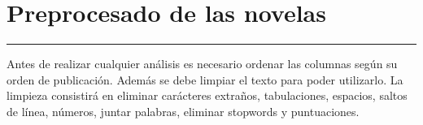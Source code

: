\documentclass[
]{article}
\begin{document}
\hypertarget{preprocesado-de-las-novelas}{%
\section{\texorpdfstring{\textbf{Preprocesado de las
novelas}}{Preprocesado de las novelas}}\label{preprocesado-de-las-novelas}}

\begin{center}\rule{0.5\linewidth}{0.5pt}\end{center}

Antes de realizar cualquier análisis es necesario ordenar las columnas
según su orden de publicación. Además se debe limpiar el texto para
poder utilizarlo. La limpieza consistirá en eliminar carácteres
extraños, tabulaciones, espacios, saltos de línea, números, juntar
palabras, eliminar stopwords y puntuaciones.
\end{document}
